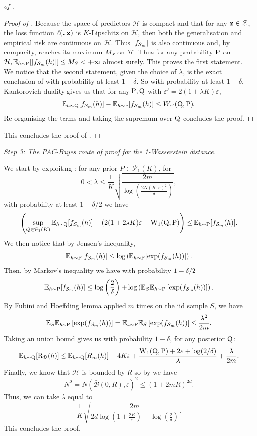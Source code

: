 \begin{proof}[of ]
\begin{lemma}
\end{lemma}
\begin{proof}[Proof of ]
Because the space of predictors $\mathcal{H}$ is compact and that for any $\z\in\mathcal{Z}$, the loss function $\ell(.,\z)$ is $K$-Lipschitz on $\mathcal{H}$, then both the generalisation and empirical risk are continuous on $\mathcal{H}$. Thus $|f_{\Sm}|$ is also continuous and, by compacity, reaches its maximum $M_S$ on $\mathcal{H}$. Thus for any probability $\P$ on $\mathcal{H}, \mathbb{E}_{h\sim \P}[|f_{\Sm}(h)|] \leq M_S < +\infty$ almost surely. This proves the first statement.
We notice that the second statement, given the choice of $\lambda$, is the exact conclusion  of  with probability at least $1-\delta$.
So with probability at least $1-\delta$, Kantorovich duality gives us that for any $\P,\Q$ with $\varepsilon'= 2(1+ \lambda K) \varepsilon$,
\begin{align*}
\mathbb{E}_{h\sim \Q}[ f_{\Sm}(h)] - \mathbb{E}_{h\sim \P}[f_{\Sm}(h)] \leq W_{\varepsilon'}(\Q,\P).
\end{align*}
Re-organising the terms and taking the supremum over $\Q$ concludes the proof.
\end{proof}
This concludes the proof of .
\end{proof}

\textit{Step 3: The PAC-Bayes route of proof for the 1-Wasserstein distance.}

We start by exploiting : for any prior $P\in\mathcal{P}_1(K)$, for $$0<\lambda \leq  \frac{1}{K}\sqrt{\frac{2m}{\log\left(\frac{2N(K,\varepsilon)^2}{\delta}\right)}},$$
with probability at least $1-\delta/2$ we have
\[ \left(\sup_{Q\in \mathcal{P}_1(K)} \mathbb{E}_{h\sim \Q}[ f_{\Sm}(h)] - (2(1+2\lambda K)\varepsilon - \W_{1}(\Q,\P) \right) \leq \mathbb{E}_{h\sim \P}[ f_{\Sm}(h)]. \]
We then notice that by Jensen's inequality,  $$\mathbb{E}_{h\sim \P}[ f_{\Sm}(h)] \leq \log\left(\mathbb{E}_{h\sim \P}[ \exp(f_{\Sm}(h))]    \right).$$
Then, by Markov's inequality we have with probability $1-\delta/2$
\[ \mathbb{E}_{h\sim \P}[ f_{\Sm}(h)] \leq \log\left(\frac{2}{\delta}\right) + \log\left(\mathbb{E}_S\mathbb{E}_{h\sim \P}\left[ \exp(f_{\Sm}(h))   \right]\right).  \]
By Fubini and Hoeffding lemma applied $m$ times on the iid sample $S$, we have
\[ \mathbb{E}_S\mathbb{E}_{h\sim \P}\left[ \exp(f_{\Sm}(h))\right] =  \mathbb{E}_{h\sim \P}\mathbb{E}_S\left[ \exp(f_{\Sm}(h))\right] \leq \frac{\lambda^2}{2m}. \]
Taking an union bound gives us with probability $1-\delta$, for any posterior $\Q$:
\[ \mathbb{E}_{h\sim \Q}[\Risk_{\D}(h)] \leq \mathbb{E}_{h\sim \Q}[R_m(h)] +   4K\varepsilon + \frac{\W_{1}(\Q,\P)+2\varepsilon +\log(2/\delta)}{\lambda} + \frac{\lambda}{2m}.   \]
Finally, we know that $\mathcal{H}$ is bounded by $R$ so by  we have $$N^2 = N(\bar{\mathcal{B}}(0,R), \varepsilon)^2 \leq \left(1+ 2mR \right)^{2d}.$$
Thus, we can take $\lambda$ equal to $$\frac{1}{K}\sqrt{\frac{2m}{2d\log(1+\frac{2R}{\varepsilon})+\log(\frac{2}{\delta})}}.$$
This concludes the proof.






